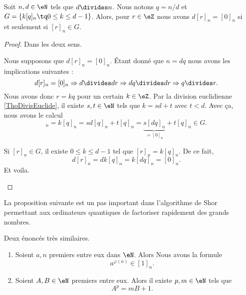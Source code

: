 \begin{lemma}		\label{LEMooRGIYooRxgyCO}
	Soit \( n,d\in \eN\) tels que \( d\divides n\). Nous notons \( q=n/d\) et \( G=\{ k[q]_n\tq 0\leq k\leq d-1 \}\). Alors, pour \( r\in \eZ\) nous avons \( d[r]_n=[0]_n\) si et seulement si \( [r]_n\in G\).
\end{lemma}

\begin{proof}
	Dans les deux sens.
	\begin{subproof}
		\spitem[\( \Rightarrow\)]
		Nous supposons que \( d[r]_n=[0]_n\). Étant donné que \( n=dq\) nous avons les implications suivantes :
		\begin{equation}
			d[r]_n=[0]_n\Rightarrow d\divides dr\Rightarrow dq\divides dr\Rightarrow q\divides r.
		\end{equation}
		Nous avons donc \( r=kq\) pour un certain \( k\in \eZ\). Par la division euclidienne \ref{ThoDivisEuclide}, il existe \( s,t\in \eN\) tels que \( k=sd+t\) avec \( t<d\). Avec ça, nous avons le calcul
		\begin{equation}
			[r]_n=k[q]_n=sd[q]_n+t[q]_n=\underbrace{s[dq]_n}_{=[0]_n}+t[q]_n\in G.
		\end{equation}

		\spitem[$\Leftarrow$]
		Si \( [r]_n\in G\), il existe \( 0\leq k\leq d-1\) tel que \( [r]_n=k[q]_n\). De ce fait,
		\begin{equation}
			d[r]_n=dk[q]_n=k[dq]_n=[0]_n.
		\end{equation}
		Et voila.
	\end{subproof}
\end{proof}

La proposition suivante est un pas important dans l'algorithme de Shor permettant aux ordinateurs quantiques de factoriser rapidement des grands nombres\cite{BIBooBBRQooJxksHX}.

\begin{theorem}		\label{THOooXMBSooXrrfOP}
	Deux énoncés très similaires.
	\begin{enumerate}
		\item
		      Soient \( a,n\) premiers entre eux dans \( \eN\). Alors
		      Nous avons la formule
		      \begin{equation}
			      a^{\varphi(n)}\in [1]_n.
		      \end{equation}
		\item		\label{ITEMooJHZBooXVKMlT}
		      Soient \( A,B\in \eN\) premiers entre eux. Alors il existe \( p,m\in \eN\) tels que
		      \begin{equation}
			      A^p=mB+1.
		      \end{equation}
	\end{enumerate}
\end{theorem}

